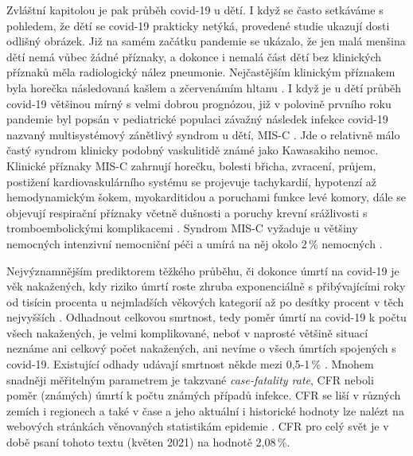 Zvláštní kapitolou je pak průběh covid-19 u dětí. I když se často setkáváme s pohledem, že dětí se covid-19 prakticky netýká, provedené studie ukazují dosti odlišný obrázek. Již na samém začátku pandemie se ukázalo, že jen malá menšina dětí nemá vůbec žádné příznaky, a dokonce i nemalá část dětí bez klinických příznaků měla radiologický nález pneumonie. Nejčastějším klinickým příznakem byla horečka následovaná kašlem a zčervenámím hltanu \cite{Lu:2020b}. I když je u dětí průběh covid-19 většinou mírný s velmi dobrou prognózou, již v polovině prvního roku pandemie byl popsán v pediatrické populaci závažný následek infekce covid-19 nazvaný multisystémový zánětlivý syndrom u dětí, MIS-C \cite{Feldstein:2020}. Jde o relativně málo častý syndrom klinicky podobný vaskulitidě známé jako Kawasakiho nemoc. Klinické příznaky MIS-C zahrnují horečku, bolesti břicha, zvracení, průjem, postižení kardiovaskulárního systému se projevuje tachykardií, hypotenzí až hemodynamickým šokem, myokarditidou a poruchami funkce levé komory, dále se objevují respirační příznaky včetně dušnosti a poruchy krevní srážlivosti s tromboembolickými komplikacemi \cite{Hoste:2021}. Syndrom MIS-C vyžaduje u většiny nemocných intenzivní nemocniční péči a umírá na něj okolo 2\,\% nemocných \cite{Hoste:2021}.

Nejvýznamnějším prediktorem těžkého průběhu, či dokonce úmrtí na covid-19 je věk nakažených, kdy riziko úmrtí roste zhruba exponenciálně s přibývajícími roky od tisícin procenta u nejmladších věkových kategorií až po desítky procent v těch nejvyšších \cite{ODriscoll:2020}. Odhadnout celkovou smrtnost, tedy poměr úmrtí na covid-19 k počtu všech nakažených, je velmi komplikované, neboť v naprosté většině situací neznáme ani celkový počet nakažených, ani nevíme o všech úmrtích spojených s covid-19. Existující odhady udávají smrtnost někde mezi 0,5-1\,\% \cite{Meyerowitz-Katz:2020}. Mnohem snadněji měřitelným parametrem je takzvané \textit{case-fatality rate}, CFR neboli poměr (známých) úmrtí k počtu známých případů infekce. CFR se liší v různých zemích i regionech a také v čase a jeho aktuální i historické hodnoty lze nalézt na webových stránkách věnovaných statistikám epidemie \cite{owidcoronavirus}. CFR pro celý svět je v době psaní tohoto textu (květen 2021) na hodnotě 2,08\,\%.

